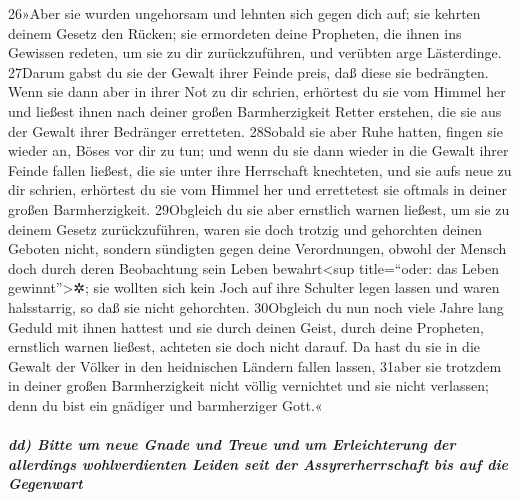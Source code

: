 26»Aber sie wurden ungehorsam und lehnten sich gegen dich auf; sie
kehrten deinem Gesetz den Rücken; sie ermordeten deine Propheten, die
ihnen ins Gewissen redeten, um sie zu dir zurückzuführen, und verübten
arge Lästerdinge. 27Darum gabst du sie der Gewalt ihrer Feinde preis,
daß diese sie bedrängten. Wenn sie dann aber in ihrer Not zu dir
schrien, erhörtest du sie vom Himmel her und ließest ihnen nach deiner
großen Barmherzigkeit Retter erstehen, die sie aus der Gewalt ihrer
Bedränger erretteten. 28Sobald sie aber Ruhe hatten, fingen sie wieder
an, Böses vor dir zu tun; und wenn du sie dann wieder in die Gewalt
ihrer Feinde fallen ließest, die sie unter ihre Herrschaft knechteten,
und sie aufs neue zu dir schrien, erhörtest du sie vom Himmel her und
errettetest sie oftmals in deiner großen Barmherzigkeit. 29Obgleich du
sie aber ernstlich warnen ließest, um sie zu deinem Gesetz
zurückzuführen, waren sie doch trotzig und gehorchten deinen Geboten
nicht, sondern sündigten gegen deine Verordnungen, obwohl der Mensch
doch durch deren Beobachtung sein Leben bewahrt\textless sup
title=``oder: das Leben gewinnt''\textgreater✲; sie wollten sich kein
Joch auf ihre Schulter legen lassen und waren halsstarrig, so daß sie
nicht gehorchten. 30Obgleich du nun noch viele Jahre lang Geduld mit
ihnen hattest und sie durch deinen Geist, durch deine Propheten,
ernstlich warnen ließest, achteten sie doch nicht darauf. Da hast du sie
in die Gewalt der Völker in den heidnischen Ländern fallen lassen,
31aber sie trotzdem in deiner großen Barmherzigkeit nicht völlig
vernichtet und sie nicht verlassen; denn du bist ein gnädiger und
barmherziger Gott.«

\hypertarget{dd-bitte-um-neue-gnade-und-treue-und-um-erleichterung-der-allerdings-wohlverdienten-leiden-seit-der-assyrerherrschaft-bis-auf-die-gegenwart}{%
\subparagraph{dd) Bitte um neue Gnade und Treue und um Erleichterung der
allerdings wohlverdienten Leiden seit der Assyrerherrschaft bis auf die
Gegenwart}\label{dd-bitte-um-neue-gnade-und-treue-und-um-erleichterung-der-allerdings-wohlverdienten-leiden-seit-der-assyrerherrschaft-bis-auf-die-gegenwart}}

